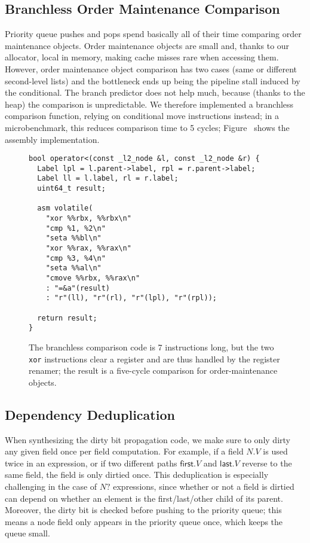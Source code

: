 \subsection{Branchless Order Maintenance Comparison}
Priority queue pushes and pops spend basically all of their time
  comparing order maintenance objects.
Order maintenance objects are small and,
  thanks to our allocator, local in memory,
  making cache misses rare when accessing them.
However, order maintenance object comparison has two cases
  (same or different second-level lists)
  and the bottleneck ends up being the pipeline stall
  induced by the conditional.
The branch predictor does not help much,
  because (thanks to the heap) the comparison is unpredictable.
We therefore implemented a branchless comparison function,
  relying on conditional move instructions instead;
  in a microbenchmark, this reduces comparison time
  to 5 cycles; Figure~\cite{fig:compare} shows the
  assembly implementation.


\begin{figure}
\begin{verbatim}
bool operator<(const _l2_node &l, const _l2_node &r) {
  Label lpl = l.parent->label, rpl = r.parent->label;
  Label ll = l.label, rl = r.label;
  uint64_t result;

  asm volatile(
    "xor %%rbx, %%rbx\n"
    "cmp %1, %2\n"
    "seta %%bl\n"
    "xor %%rax, %%rax\n"
    "cmp %3, %4\n"
    "seta %%al\n"
    "cmove %%rbx, %%rax\n"  
    : "=&a"(result)
    : "r"(ll), "r"(rl), "r"(lpl), "r"(rpl));

  return result;
}
\end{verbatim}
\caption{
  The branchless comparison code is 7 instructions long,
    but the two \texttt{xor} instructions
    clear a register and are thus handled by the register renamer;
    the result is a five-cycle comparison
    for order-maintenance objects.
}
\label{fig:compare}
\end{figure}

\subsection{Dependency Deduplication}

When synthesizing the dirty bit propagation code,
  we make sure to only dirty any given field once per field computation.
For example, if a field $N.V$ is used twice in an expression,
  or if two different paths $\mathsf{first}.V$ and $\mathsf{last}.V$
  reverse to the same field,
  the field is only dirtied once.
This deduplication is especially challenging in the case
  of $N?$ expressions,
  since whether or not a field is dirtied can depend on whether an element
  is the first/last/other child of its parent.
Moreover, the dirty bit is checked before pushing to the priority queue;
  this means a node field only appears in the priority queue once,
  which keeps the queue small.

